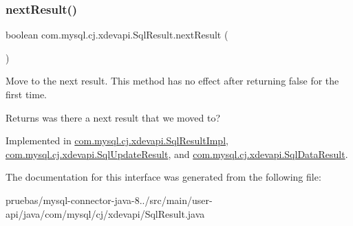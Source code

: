 \subsubsection{\texorpdfstring{next\+Result()}{nextResult()}}
{\footnotesize\ttfamily boolean com.\+mysql.\+cj.\+xdevapi.\+Sql\+Result.\+next\+Result (\begin{DoxyParamCaption}{ }\end{DoxyParamCaption})}

Move to the next result. This method has no effect after returning {\ttfamily false} for the first time.

\begin{DoxyReturn}{Returns}
was there a next result that we moved to? 
\end{DoxyReturn}


Implemented in \mbox{\hyperlink{classcom_1_1mysql_1_1cj_1_1xdevapi_1_1_sql_result_impl_a63d1fa4f9bdb44615cb07d3324e96341}{com.\+mysql.\+cj.\+xdevapi.\+Sql\+Result\+Impl}}, \mbox{\hyperlink{classcom_1_1mysql_1_1cj_1_1xdevapi_1_1_sql_update_result_a3fad012f9b23f87f7aac62edd51c604a}{com.\+mysql.\+cj.\+xdevapi.\+Sql\+Update\+Result}}, and \mbox{\hyperlink{classcom_1_1mysql_1_1cj_1_1xdevapi_1_1_sql_data_result_a4dc2d012228a58a9ebe74f93f9a007a9}{com.\+mysql.\+cj.\+xdevapi.\+Sql\+Data\+Result}}.



The documentation for this interface was generated from the following file\+:\begin{DoxyCompactItemize}
\item 
pruebas/mysql-\/connector-\/java-\/8../src/main/user-\/api/java/com/mysql/cj/xdevapi/Sql\+Result.\+java\end{DoxyCompactItemize}
